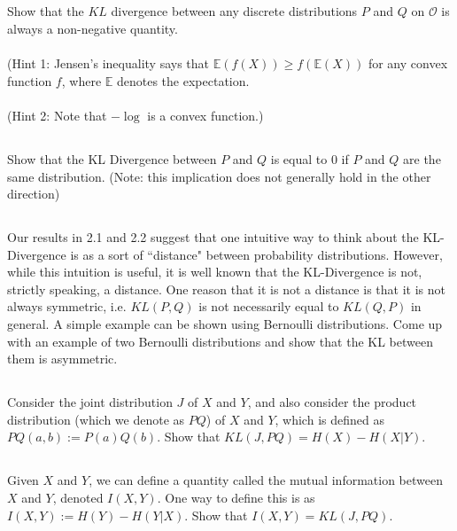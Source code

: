 \documentclass{exam}
\begin{document}
\subsection{}
Show that the $KL$ divergence between any discrete distributions $P$ and $Q$ on $\mathcal{O}$ is always a non-negative quantity. 
\\\\(Hint 1: Jensen's inequality says that $\mathbb{E}(f(X)) \geq f(\mathbb{E}(X))$ for any convex function $f$, where $\mathbb{E}$ denotes the expectation. \\\\(Hint 2: Note that $-\log$ is a convex function.) 


\subsection{}
Show that the KL Divergence between $P$ and $Q$ is equal to $0$ if $P$ and $Q$ are the same distribution. (Note: this implication does not generally hold in the other direction)

\subsection{}
Our results in 2.1 and 2.2 suggest that one intuitive way to think about the KL-Divergence is as a sort of ``distance" between probability distributions. However, while this intuition is useful, it is well known that the KL-Divergence is not, strictly speaking, a distance. One reason that it is not a distance is that it is not always symmetric, i.e. $KL(P, Q)$ is not necessarily equal to $KL(Q, P)$ in general. A simple example can be shown using Bernoulli distributions. Come up with an example of two Bernoulli distributions and show that the KL between them is asymmetric. 

\subsection{}
Consider the joint distribution $J$ of $X$ and $Y$, and also consider the product distribution (which we denote as $PQ$) of $X$ and $Y$, which is defined as $PQ(a, b) := P(a) Q(b)$. Show that $KL(J, PQ) = H(X) - H(X|Y)$.

\subsection{}
Given $X$ and $Y$, we can define a quantity called the mutual information between $X$ and $Y$, denoted $I(X, Y)$. One way to define this is as $I(X, Y) := H(Y) - H(Y|X)$. Show that $I(X, Y) = KL(J, PQ)$.
 
\end{document}

